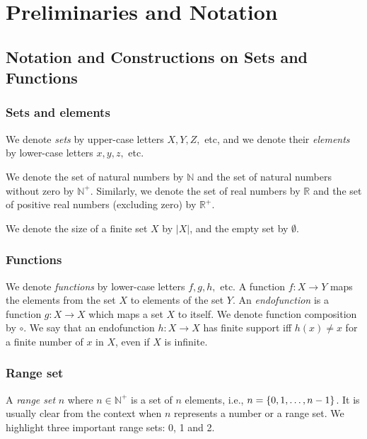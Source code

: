 

\chapter{Preliminaries and Notation} %
\label{ch:Preliminaries} %


\section{Notation and Constructions on Sets and Functions}
\subsection{Sets and elements}
We denote \emph{sets} by upper-case letters $X,Y,Z,$ etc, and we denote their \emph{elements} by lower-case letters $x, y, z, $ etc. 

We denote the set of natural numbers by $\mathbb{N}$ and the set of natural numbers without zero by $\mathbb{N}^+$. Similarly, we denote the set of real numbers by $\mathbb{R}$ and the set of positive real numbers (excluding zero) by $\mathbb{R}^+$.

We denote the size of a finite set $X$ by $|X|$, and the empty set by $\emptyset$.

\subsection{Functions}
We denote \emph{functions} by lower-case letters $f,g,h,$ etc. A function $f\colon X\rightarrow Y$ maps the elements from the set $X$ to elements of the set $Y$. An \emph{endofunction} is a function $g\colon X\rightarrow X$ which maps a set $X$ to itself. We denote function composition by $\circ$. 
We say that an endofunction $h\colon X \rightarrow X$ has finite support iff $h(x)\neq x$ for a finite number of $x$ in $X$, even if $X$ is infinite.

\subsection{Range set}
A \emph{range set} $n$ where $n\in \mathbb{N}^+$ is a set of $n$ elements, i.e., $n=\left\{0,1, \ldots, n-1\right\}$. It is usually clear from the context when $n$ represents a number or a range set. We highlight three important range sets: 0, 1 and 2.

